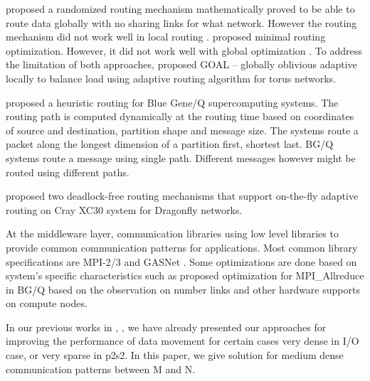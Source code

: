 \cite{Valiant81:Routing} proposed a randomized routing mechanism mathematically proved to be able to route data globally with no sharing links for what network. However the routing mechanism did not work well in local routing \cite{singh2003:GOAL} . \cite{Pifarre91} proposed minimal routing optimization. However, it did not work well with global optimization \cite{singh2003:GOAL} . To address the limitation of both approaches, \cite{singh2003:GOAL} proposed GOAL – globally oblivious adaptive locally to balance load using adaptive routing algorithm for torus networks. 

\cite{Chen:BGQ} proposed a heuristic routing for Blue Gene/Q supercomputing systems. The routing path is computed dynamically at the routing time based on coordinates of source and destination, partition shape and message size. The systems route a packet along the longest dimension of a partition first, shortest last. BG/Q systems route a message using single path. Different messages however might be routed using different paths.

\cite{garcia2013:CrayDragonfly} proposed two deadlock-free routing mechanisms that support on-the-fly adaptive routing on Cray XC30 system for Dragonfly networks.

At the middleware layer, communication libraries using low level libraries to provide common communication patterns for applications. Most common library specifications are MPI-2/3 and GASNet \cite{Yelick07:PGAS}. Some optimizations are done based on system’s specific characteristics such as \cite{Kumar:Allreduce} proposed optimization for MPI\_Allreduce in BG/Q based on the observation on number links and other hardware supports on compute nodes.

In our previous works in \cite{Vishwanath:GLEAN}, \cite{SDAV:Bui2014b}, \cite{hbui:bgq} we have already presented our approaches for improving the performance of data movement for certain cases very dense in I/O case, or very sparse in p2s2. In this paper, we give solution for medium dense communication patterns between M and N.
